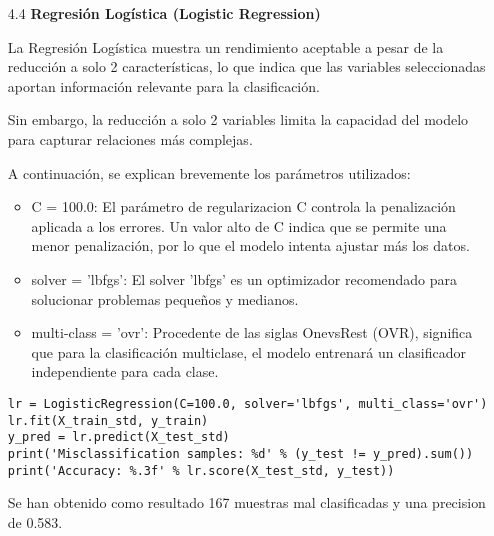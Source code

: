\documentclass{article}
\begin{document}
\begin{itemize}

\item[4.4]  {\bf Regresi\'on Log\'istica (Logistic Regression)}

La Regresi\'on Log\'istica muestra un rendimiento aceptable a pesar de la reducci\'on a solo 2 caracter\'isticas, lo que indica que las variables seleccionadas aportan informaci\'on relevante para la clasificaci\'on.

Sin embargo, la reducci\'on a solo 2 variables limita la capacidad del modelo para capturar relaciones m\'as complejas.

A continuaci\'on, se explican brevemente los par\'ametros utilizados:

\begin{itemize}

\item
C = 100.0: El par\'ametro de regularizacion C controla la penalizaci\'on aplicada a los errores. Un valor alto de C indica que se permite una menor penalizaci\'on, por lo que el modelo intenta ajustar m\'as los datos.

\item
solver = 'lbfgs': El solver 'lbfgs' es un optimizador recomendado para solucionar problemas pequeños y medianos.

\item
multi-class = 'ovr': Procedente de las siglas OnevsRest (OVR), significa que para la
clasificaci\'on multiclase, el modelo entrenar\'a un clasificador independiente para cada clase.

\end{itemize}

\begin{tcolorbox}[width=14cm]
\begin{scriptsize}
\begin{verbatim}
lr = LogisticRegression(C=100.0, solver='lbfgs', multi_class='ovr')
lr.fit(X_train_std, y_train)
y_pred = lr.predict(X_test_std)
print('Misclassification samples: %d' % (y_test != y_pred).sum())
print('Accuracy: %.3f' % lr.score(X_test_std, y_test))
\end{verbatim}
\end{scriptsize}
\end{tcolorbox}

Se han obtenido como resultado 167 muestras mal clasificadas y una precision de 0.583.

\end{itemize}
\end{document}

